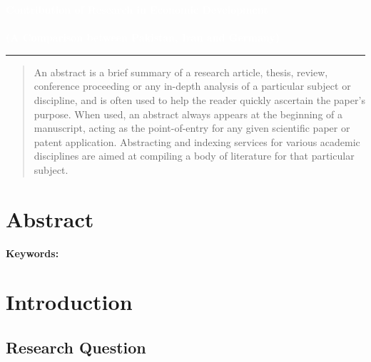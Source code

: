 \documentclass[letterpaper]{article}
\author{%
    \textbf{FAST NUCES}\\
    Department of Computer Science \\
    \textbf{\newline Authors:} \\
    \item[$\cdot$] Rafay Ghafoor 
    \item[$\cdot$] Humza Ali
    \item[$\cdot$] Subhan Ahmed 
    \item[$\cdot$] Umer Shehzad 
    \item[$\cdot$] Zia Shahid 
    }
\makeatletter
\def\printauthor{%
    {\large \@author}}
\makeatother
\begin{document}
\begin{titlepage}
\BgThispage
{}
\vspace*{0.3\textheight}
\noindent
\textcolor{white}{\huge\textbf{\textsf{Contribution of Research in Economic Development}}} \\ \\
\textcolor{white}{\LARGE\textbf{\textsf{(A Comparison between Pakistan, Iran and Germany)}}} \\
\vspace*{3cm}\par
\noindent
\begin{minipage}{0.35\linewidth}
    \begin{flushright}
        \printauthor
    \end{flushright}
\end{minipage} \hspace{15pt}
%
\begin{minipage}{0.02\linewidth}
    \rule{1pt}{175pt}
\end{minipage} \hspace{-10pt}
%
\begin{minipage}{0.63\linewidth}
\vspace{5pt}
    \begin{abstract} 
An abstract is a brief summary of a research article, thesis, review, conference proceeding or any in-depth analysis of a particular subject or discipline, and is often used to help the reader quickly ascertain the paper's purpose. When used, an abstract always appears at the beginning of a manuscript, acting as the point-of-entry for any given scientific paper or patent application. Abstracting and indexing services for various academic disciplines are aimed at compiling a body of literature for that particular subject.
    \end{abstract}
\end{minipage}
\end{titlepage}
\restoregeometry
\newpage

\newpage
\tableofcontents
\newpage

\section{Abstract}
\textbf{Keywords:}
\section{Introduction}
\subsection{Research Question}
\end{document}
